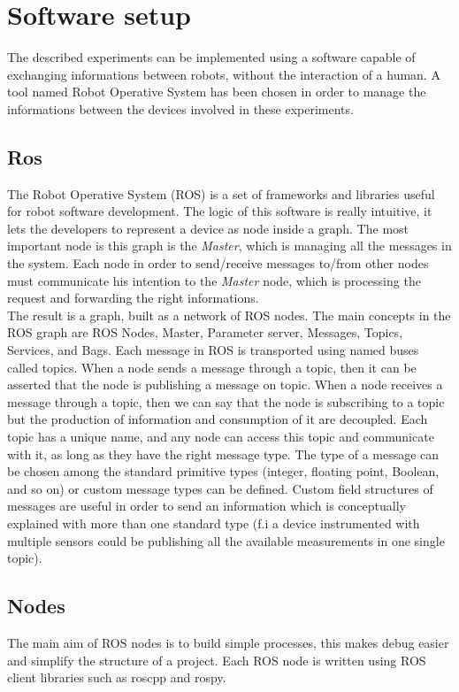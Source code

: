 \chapter{Software setup}
The described experiments can be implemented using a software capable of exchanging informations between robots, without the interaction of a human. A tool named Robot Operative System has been chosen in order to manage the informations between the devices involved in these experiments.
%  
\section{Ros}
The Robot Operative System (ROS) is a set of frameworks and libraries useful for robot software development. The logic of this software is really intuitive, it lets the developers to represent a device as node inside a graph. The most important node is this graph is the \textit{Master}, which is managing all the messages in the system. Each node in order to send/receive messages to/from other nodes must communicate his intention to the \textit{Master} node, which is processing the request and forwarding the right informations.\\
The result is a graph, built as a network of ROS nodes. The main concepts in the ROS graph are ROS Nodes, Master, Parameter server, Messages, Topics, Services, and Bags. 
Each message in ROS is transported using named buses called topics. When a node sends a message through a topic, then it can be asserted that the node is publishing a message on topic. When a node receives a message through a topic, then we can say that the node is subscribing to a topic but the production of information and consumption of it are decoupled. 
Each topic has a unique name, and any node can access this topic and communicate with it, as long as they have the right message type. The type of a message can be chosen among the standard primitive types (integer, floating point, Boolean, and so on) or custom message types can be defined. Custom field structures of messages are useful in order to send an information which is conceptually explained with more than one standard type (f.i a device instrumented with multiple sensors could be publishing all the available measurements in one single topic).

\section{Nodes}
The main aim of ROS nodes is to build simple processes, this makes debug easier and simplify the structure of a project. Each ROS node is written using ROS client libraries such as roscpp and rospy.%

